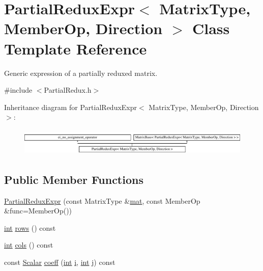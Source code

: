 \hypertarget{class_partial_redux_expr}{\section{Partial\-Redux\-Expr$<$ Matrix\-Type, Member\-Op, Direction $>$ Class Template Reference}
\label{class_partial_redux_expr}
}


Generic expression of a partially reduxed matrix.  




{\ttfamily \#include $<$Partial\-Redux.\-h$>$}

Inheritance diagram for Partial\-Redux\-Expr$<$ Matrix\-Type, Member\-Op, Direction $>$\-:\begin{figure}[H]
\begin{center}
\leavevmode
\includegraphics[height=1.323877cm]{class_partial_redux_expr}
\end{center}
\end{figure}
\subsection*{Public Member Functions}
\begin{DoxyCompactItemize}
\item 
\hyperlink{class_partial_redux_expr_a2e34dae3ed53b5185dd8493612cdcc0b}{Partial\-Redux\-Expr} (const Matrix\-Type \&\hyperlink{uavobjecttemplate_8m_a16a51e808b16c46bbfd36da2e37cd123}{mat}, const Member\-Op \&func=Member\-Op())
\item 
\hyperlink{ioapi_8h_a787fa3cf048117ba7123753c1e74fcd6}{int} \hyperlink{class_partial_redux_expr_aaf7bee1922524e06b076c8581cef2cd6}{rows} () const 
\item 
\hyperlink{ioapi_8h_a787fa3cf048117ba7123753c1e74fcd6}{int} \hyperlink{class_partial_redux_expr_ad9fc85fb9c41138534c6b69ba3eee2f6}{cols} () const 
\item 
const \hyperlink{class_matrix_base_a625df8339dc2d816cbc0fd66e7dadaf5}{Scalar} \hyperlink{class_partial_redux_expr_abf928a6bb4a5b6153ff37aeb64be158f}{coeff} (\hyperlink{ioapi_8h_a787fa3cf048117ba7123753c1e74fcd6}{int} \hyperlink{uavobjecttemplate_8m_a6f6ccfcf58b31cb6412107d9d5281426}{i}, \hyperlink{ioapi_8h_a787fa3cf048117ba7123753c1e74fcd6}{int} j) const 
\end{DoxyCompactItemize}
